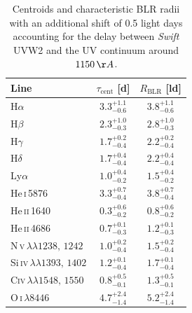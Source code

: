 \begin{table}[htbp]
	\centering
	\caption[Centroid and characteristic BLR radii]{Centroids and characteristic BLR radii with an additional shift  of 0.5 light days accounting for the delay  between \textit{Swift} UVW2 and the UV continuum around $1150\,\AA$.}
	\label{tab:lags_UVW2}
	\begin{tabular}{l c c}
		\hline\hline
		Line & $\tau_{\text{cent}}$ [d] & $R_{\mathrm{BLR}}$ [ld] \\
		\hline\hline
		H$\alpha$             & $3.3 \ensuremath{_{-0.6}^{+1.1}}$ & $3.8 \ensuremath{_{-0.6}^{+1.1}}$ \\
		H$\beta$              & $2.3 \ensuremath{_{-0.3}^{+1.0}}$ & $2.8 \ensuremath{_{-0.3}^{+1.0}}$ \\
		H$\gamma$             & $1.7 \ensuremath{_{-0.4}^{+0.2}}$ & $2.2 \ensuremath{_{-0.4}^{+0.2}}$ \\
		H$\delta$             & $1.7 \ensuremath{_{-0.4}^{+0.4}}$ & $2.2 \ensuremath{_{-0.4}^{+0.4}}$ \\
		Ly$\alpha$            & $1.0 \ensuremath{_{-0.2}^{+0.4}}$ & $1.5 \ensuremath{_{-0.2}^{+0.4}}$ \\
		\hline
		He\,\textsc{i}\,5876  & $3.3 \ensuremath{_{-0.4}^{+0.7}}$ & $3.8 \ensuremath{_{-0.4}^{+0.7}}$ \\
		He\,\textsc{ii}\,1640 & $0.3 \ensuremath{_{-0.2}^{+0.6}}$ & $0.8 \ensuremath{_{-0.2}^{+0.6}}$ \\
		He\,\textsc{ii}\,4686 & $0.7 \ensuremath{_{-0.3}^{+0.1}}$ & $1.2 \ensuremath{_{-0.3}^{+0.1}}$ \\
		\hline
		N\,\textsc{v}$\,\lambda\lambda 1238,\,1242$    & $1.0 \ensuremath{_{-0.4}^{+0.2}}$ & $1.5 \ensuremath{_{-0.4}^{+0.2}}$ \\
		Si\,\textsc{iv}$\,\lambda\lambda 1393,\,1402$  & $1.2 \ensuremath{_{-0.4}^{+0.1}}$ & $1.7 \ensuremath{_{-0.4}^{+0.1}}$ \\
		C\textsc{iv}$\,\lambda\lambda 1548,\,1550$     & $0.8 \ensuremath{_{-0.1}^{+0.5}}$ & $1.3 \ensuremath{_{-0.1}^{+0.5}}$ \\
		\hline
		O\,\textsc{i}$\,\lambda 8446$   & $4.7 \ensuremath{_{-1.4}^{+2.4}}$ & $5.2 \ensuremath{_{-1.4}^{+2.4}}$ \\
		\hline\hline
	\end{tabular}
\end{table}
